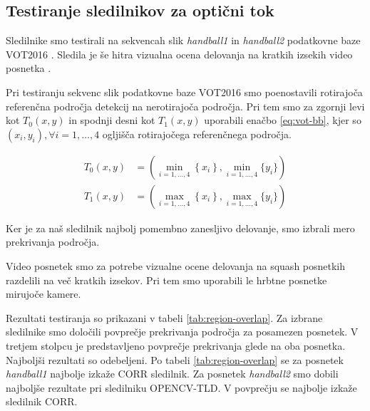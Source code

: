 \subsection{Testiranje sledilnikov za optični tok}\label{sec:testiranje-sledilnikov-za-opticni-tok}
Sledilnike smo testirali na sekvencah slik \textit{handball1} in \textit{handball2} podatkovne baze VOT2016 \cite{kristan2016visual}. Sledila je še hitra vizualna ocena delovanja na kratkih izsekih video posnetka \cite{squashtv2014squash}.

Pri testiranju sekvenc slik podatkovne baze VOT2016 smo poenostavili rotirajoča referenčna področja detekcij na nerotirajoča področja. Pri tem smo za zgornji levi kot $T_0(x,y)$ in spodnji desni kot $T_1(x,y)$ uporabili enačbo \eqref{eq:vot-bb}, kjer so $\left( x_i, y_i\right), \forall i=1,\ldots,4$ ogljišča rotirajočega referenčnega področja. 

\begin{equation}
\begin{aligned}
	T_0(x,y) &= \left( \min_{i = 1,\ldots,4}\left\{x_i \right\}, 
    \min_{i=1,\ldots,4}\{y_i \} \right) \\
    T_1(x,y) &= \left( \max_{i = 1,\ldots,4}\left\{x_i \right\}, 
    \max_{i=1,\ldots,4}\{y_i \} \right)
\end{aligned}
\label{eq:vot-bb}
\end{equation}

Ker je za naš sledilnik najbolj pomembno zanesljivo delovanje, smo izbrali mero prekrivanja področja.


Video posnetek \cite{squashtv2014squash} smo za potrebe vizualne ocene delovanja na squash posnetkih razdelili na več kratkih izsekov. Pri tem smo uporabili le hrbtne posnetke mirujoče kamere. 

Rezultati testiranja so prikazani v tabeli \ref{tab:region-overlap}. Za izbrane sledilnike smo določili povprečje prekrivanja področja za posamezen posnetek. V tretjem stolpcu je predstavljeno povprečje prekrivanja glede na oba posnetka. Najboljši rezultati so odebeljeni. Po tabeli \ref{tab:region-overlap} se za posnetek \textit{handball1} najbolje izkaže CORR sledilnik. Za posnetek \textit{handball2} smo dobili najboljše rezultate pri sledilniku OPENCV-TLD. V povprečju se najbolje izkaže sledilnik CORR.




